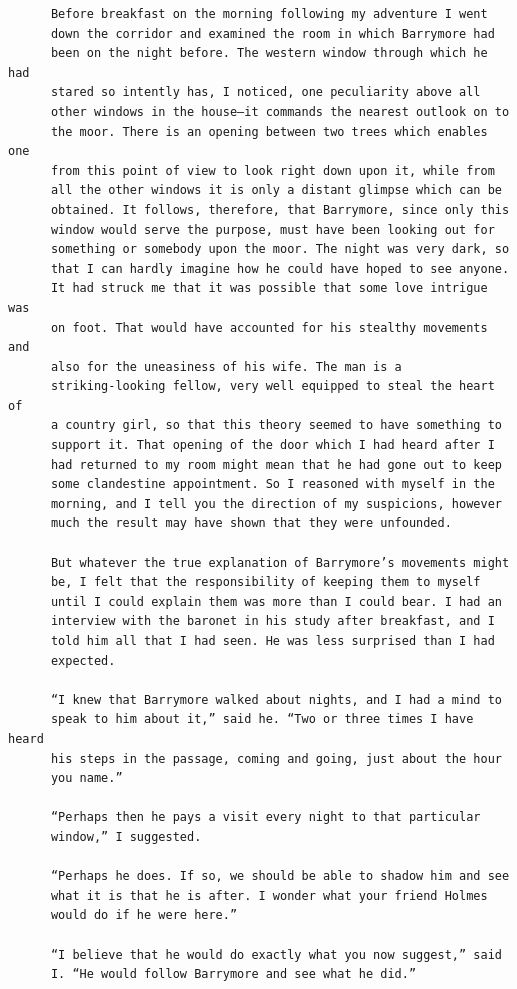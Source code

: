 \documentclass{article}
\begin{document}
\begin{verbatim}
      Before breakfast on the morning following my adventure I went
      down the corridor and examined the room in which Barrymore had
      been on the night before. The western window through which he had
      stared so intently has, I noticed, one peculiarity above all
      other windows in the house—it commands the nearest outlook on to
      the moor. There is an opening between two trees which enables one
      from this point of view to look right down upon it, while from
      all the other windows it is only a distant glimpse which can be
      obtained. It follows, therefore, that Barrymore, since only this
      window would serve the purpose, must have been looking out for
      something or somebody upon the moor. The night was very dark, so
      that I can hardly imagine how he could have hoped to see anyone.
      It had struck me that it was possible that some love intrigue was
      on foot. That would have accounted for his stealthy movements and
      also for the uneasiness of his wife. The man is a
      striking-looking fellow, very well equipped to steal the heart of
      a country girl, so that this theory seemed to have something to
      support it. That opening of the door which I had heard after I
      had returned to my room might mean that he had gone out to keep
      some clandestine appointment. So I reasoned with myself in the
      morning, and I tell you the direction of my suspicions, however
      much the result may have shown that they were unfounded.

      But whatever the true explanation of Barrymore’s movements might
      be, I felt that the responsibility of keeping them to myself
      until I could explain them was more than I could bear. I had an
      interview with the baronet in his study after breakfast, and I
      told him all that I had seen. He was less surprised than I had
      expected.

      “I knew that Barrymore walked about nights, and I had a mind to
      speak to him about it,” said he. “Two or three times I have heard
      his steps in the passage, coming and going, just about the hour
      you name.”

      “Perhaps then he pays a visit every night to that particular
      window,” I suggested.

      “Perhaps he does. If so, we should be able to shadow him and see
      what it is that he is after. I wonder what your friend Holmes
      would do if he were here.”

      “I believe that he would do exactly what you now suggest,” said
      I. “He would follow Barrymore and see what he did.”


\end{verbatim}
\end{document}
